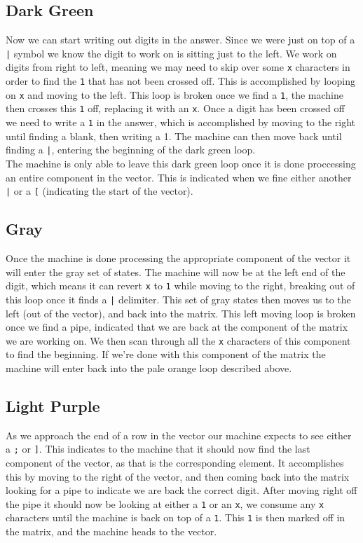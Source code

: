 \documentclass[letterpaper, 11pt]{article}
\begin{document}
\subsection{Dark Green}
\label{sec:org62a9a9e}
Now we can start writing out digits in the answer. Since we were just on top of a \texttt{|} symbol we know the digit to work on is sitting just to the left. We work on digits from right to left, meaning we may need to skip over some \texttt{x} characters in order to find the \texttt{1} that has not been crossed off. This is accomplished by looping on \texttt{x} and moving to the left. This loop is broken once we find a \texttt{1}, the machine then crosses this \texttt{1} off, replacing it with an \texttt{x}. Once a digit has been crossed off we need to write a \texttt{1} in the answer, which is accomplished by moving to the right until finding a blank, then writing a 1. The machine can then move back until finding a \texttt{|}, entering the beginning of the dark green loop.\\

The machine is only able to leave this dark green loop once it is done proccessing an entire component in the vector. This is indicated when we fine either another \texttt{|} or a \texttt{[} (indicating the start of the vector).\\
\subsection{Gray}
\label{sec:org630f6db}
Once the machine is done processing the appropriate component of the vector it will enter the gray set of states. The machine will now be at the left end of the digit, which means it can revert \texttt{x} to \texttt{1} while moving to the right, breaking out of this loop once it finds a \texttt{|} delimiter. This set of gray states then moves us to the left (out of the vector), and back into the matrix. This left moving loop is broken once we find a pipe, indicated that we are back at the component of the matrix we are working on. We then scan through all the \texttt{x} characters of this component to find the beginning. If we're done with this component of the matrix the machine will enter back into the pale orange loop described above.\\
\subsection{Light Purple}
\label{sec:org63d5673}
As we approach the end of a row in the vector our machine expects to see either a \texttt{;} or \texttt{]}. This indicates to the machine that it should now find the last component of the vector, as that is the corresponding element. It accomplishes this by moving to the right of the vector, and then coming back into the matrix looking for a pipe to indicate we are back the correct digit. After moving right off the pipe it should now be looking at either a \texttt{1} or an \texttt{x}, we consume any \texttt{x} characters until the machine is back on top of a \texttt{1}. This \texttt{1} is then marked off in the matrix, and the machine heads to the vector.\\
\end{document}
